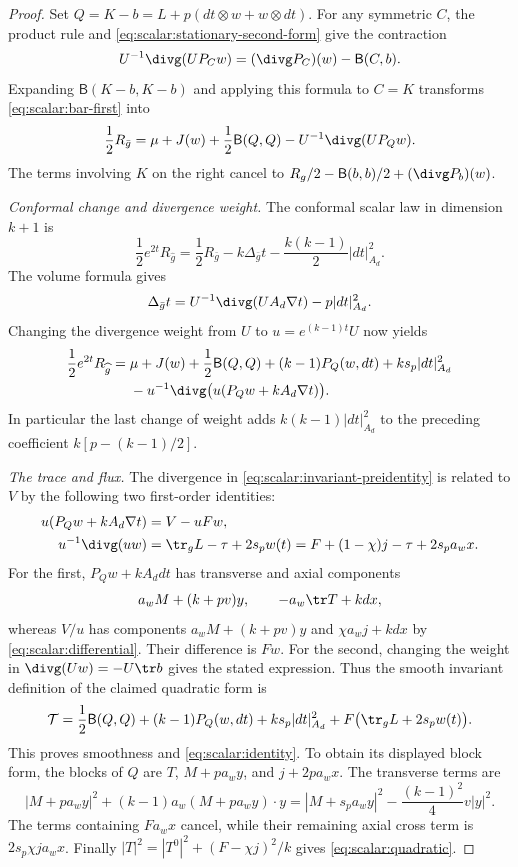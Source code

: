 \begin{proof}
Set $Q=K-b=L+p(dt\otimes w+w\otimes dt)$.  For any symmetric $C$,
the product rule and \eqref{eq:scalar:stationary-second-form}
give the contraction
\[
 U^{-1}\divg(UP_Cw)=(\divg P_C)(w)-\mathsf B(C,b).
\]
Expanding $\mathsf B(K-b,K-b)$ and applying this formula to $C=K$
transforms \eqref{eq:scalar:bar-first} into
\begin{equation}
 \frac12R_{\bar g}=\mu+J(w)+\frac12\mathsf B(Q,Q)
                         -U^{-1}\divg(UP_Qw).
 \label{eq:scalar:bar-identity}
\end{equation}
The terms involving $K$ on the right cancel to
$R_g/2-\mathsf B(b,b)/2+(\divg P_b)(w)$.

\emph{Conformal change and divergence weight.} The conformal scalar
law in dimension $k+1$ is
\[
 \frac12e^{2t}R_{\widehat g}
   =\frac12R_{\bar g}-k\Delta_{\bar g}t
                         -\frac{k(k-1)}2|dt|_{A_d}^2.
\]
The volume formula gives
\[
 \Delta_{\bar g}t
  =U^{-1}\divg(UA_d\nabla t)-p|dt|_{A_d}^2.
\]
Changing the divergence weight from $U$ to
$u=e^{(k-1)t}U$ now yields
\begin{equation}
 \begin{aligned}
 \frac12e^{2t}R_{\widehat g}
  ={}&\mu+J(w)+\frac12\mathsf B(Q,Q)
     +(k-1)P_Q(w,dt)+ks_p|dt|_{A_d}^2\\
   &-u^{-1}\divg\bigl(u(P_Qw+kA_d\nabla t)\bigr).
 \end{aligned}
 \label{eq:scalar:invariant-preidentity}
\end{equation}
In particular the last change of weight adds
$k(k-1)|dt|_{A_d}^2$ to the preceding coefficient
$k[p-(k-1)/2]$.

\emph{The trace and flux.} The divergence in
\eqref{eq:scalar:invariant-preidentity} is related to $V$ by the
following two first-order identities:
\begin{equation}
 \begin{aligned}
 u(P_Qw+kA_d\nabla t)&=V-uFw,\\
 u^{-1}\divg(uw)&=\tr_gL-\tau+2s_pw(t)
                  =F+(1-\chi)j-\tau+2s_pa_wx.
 \end{aligned}
 \label{eq:scalar:flux-relations}
\end{equation}
For the first, $P_Qw+kA_ddt$ has transverse and axial components
\[
 a_wM+(k+pv)y,\qquad -a_w\tr T+kd x,
\]
whereas $V/u$ has components
$a_wM+(k+pv)y$ and $\chi a_wj+kd x$ by
\eqref{eq:scalar:differential}.  Their difference is $Fw$.
For the second, changing the weight in $\divg(Uw)=-U\tr b$
gives the stated expression.
Thus the smooth invariant definition of the claimed quadratic form is
\begin{equation}
 \mathcal T=\frac12\mathsf B(Q,Q)+(k-1)P_Q(w,dt)
        +ks_p|dt|_{A_d}^2+F\bigl(\tr_gL+2s_pw(t)\bigr).
 \label{eq:scalar:invariant-quadratic}
\end{equation}
This proves smoothness and \eqref{eq:scalar:identity}.
To obtain its displayed block form, the blocks of $Q$ are
$T$, $M+pa_wy$, and $j+2pa_wx$.  The transverse terms are
\[
 |M+pa_wy|^2+(k-1)a_w(M+pa_wy)\cdot y
 =|M+s_pa_wy|^2-\frac{(k-1)^2}{4}v|y|^2.
\]
The terms containing $F a_wx$ cancel, while their remaining axial
cross term is $2s_p\chi ja_wx$.  Finally
$|T|^2=|T^0|^2+(F-\chi j)^2/k$ gives
\eqref{eq:scalar:quadratic}.


\end{proof}
